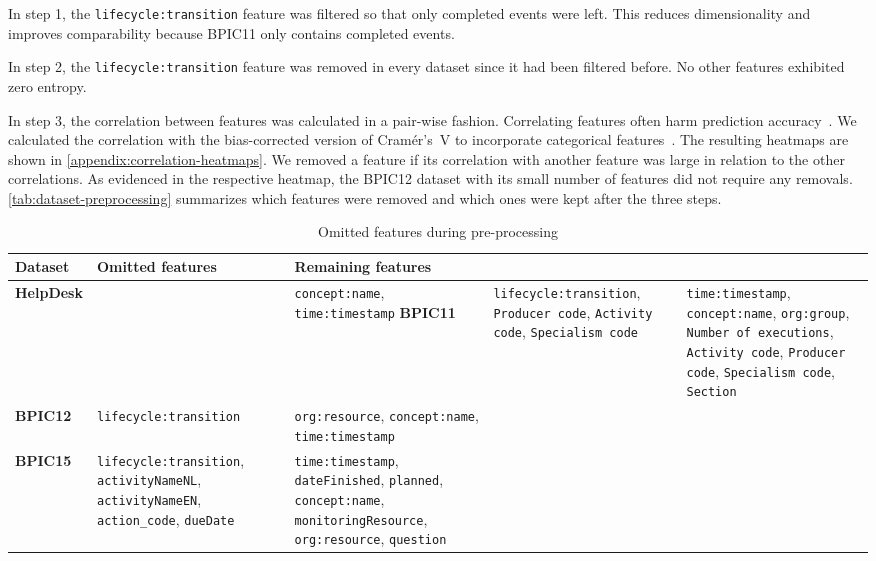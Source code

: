 In step 1, the \verb=lifecycle:transition= feature was filtered so that only completed events were left. This reduces dimensionality and improves comparability because BPIC11 only contains completed events.

In step 2, the \verb=lifecycle:transition= feature was removed in every dataset since it had been filtered before. No other features exhibited zero entropy.

In step 3, the correlation between features was calculated in a pair-wise fashion.
Correlating features often harm prediction accuracy~\cite{kuhn2013applied}.
We calculated the correlation with the bias-corrected version of Cramér's~V to incorporate categorical features~\cite{bergsma2013bias}.
The resulting heatmaps are shown in \autoref{appendix:correlation-heatmaps}.
We removed a feature if its correlation with another feature was large in relation to the other correlations. As evidenced in the respective heatmap, the BPIC12 dataset with its small number of features did not require any removals. \autoref{tab:dataset-preprocessing} summarizes which features were removed and which ones were kept after the three steps.

\begin{table}[!htb]
\centering
\begin{adjustbox}{center}
\begin{tabular}{lp{6cm}p{6cm}}
\textbf{Dataset} & \textbf{Omitted features} & \textbf{Remaining features}\\
\midrule
\textbf{HelpDesk} &  & \verb=concept:name=, \verb=time:timestamp=
\textbf{BPIC11} & \verb=lifecycle:transition=, \verb=Producer code=,  \verb=Activity code=,  \verb=Specialism code= & \verb=time:timestamp=, \verb=concept:name=, \verb=org:group=, \verb=Number of executions=, \verb=Activity code=, \verb=Producer code=, \verb=Specialism code=, \verb=Section=\\
\textbf{BPIC12} & \verb=lifecycle:transition= & \verb=org:resource=, \verb=concept:name=, \verb=time:timestamp=\\
\textbf{BPIC15} & \verb=lifecycle:transition=, \verb=activityNameNL=, \verb=activityNameEN=, \verb=action_code=, \verb=dueDate= & \verb=time:timestamp=, \verb=dateFinished=, \verb=planned=, \verb=concept:name=, \verb=monitoringResource=, \verb=org:resource=,     \verb=question=\\
\end{tabular}
\end{adjustbox}
\caption{Omitted features during pre-processing}
\label{tab:dataset-preprocessing}
\end{table}

